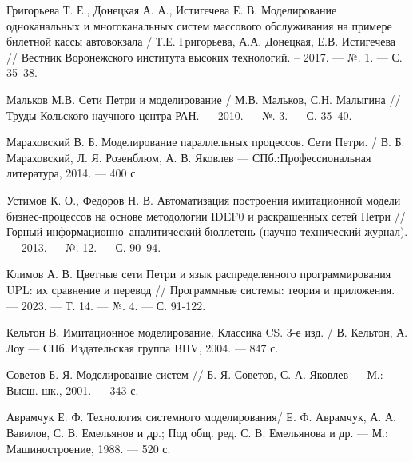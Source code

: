 \begin{thebibliography}{}
 Григорьева Т. Е., Донецкая А. А., Истигечева Е. В. Моделирование одноканальных и многоканальных систем массового обслуживания на примере билетной кассы автовокзала / Т.Е. Григорьева, А.А. Донецкая, Е.В. Истигечева  // Вестник Воронежского института высоких технологий. -- 2017. --- №. 1. --- С. 35--38.

 Мальков М.В. Сети Петри и моделирование / М.В. Мальков, С.Н. Малыгина // Труды Кольского научного центра РАН. --- 2010. --- №. 3. --- С. 35--40.

 Мараховский В. Б. Моделирование параллельных процессов. Сети Петри. / В. Б. Мараховский, Л. Я. Розенблюм,  А. В. Яковлев --- СПб.:Профессиональная литература, 2014. --- 400 с.

 Устимов К. О., Федоров Н. В. Автоматизация построения имитационной модели бизнес-процессов на основе методологии IDEF0 и раскрашенных сетей Петри // Горный информационно--аналитический бюллетень (научно-технический журнал). --- 2013. --- №. 12. --- С. 90--94.

 Климов А. В. Цветные сети Петри и язык распределенного программирования UPL: их сравнение и перевод // Программные системы: теория и приложения. --- 2023. --- Т. 14. --- №. 4. --- С. 91-122.

 Кельтон В. Имитационное моделирование. Классика CS. 3-е изд. / В. Кельтон, А. Лоу --- СПб.:Издательская группа BHV, 2004. --- 847 с.

 Советов Б. Я. Моделирование систем //  Б. Я. Советов, С. А. Яковлев --- М.: Высш. шк., 2001. --- 343 с.

 Аврамчук Е. Ф. Технология системного моделирования/ Е. Ф. Аврамчук, А. А. Вавилов, С. В. Емельянов и др.; Под общ. ред. С. В. Емельянова и др. — М.: Машиностроение, 1988. --- 520 с.

\end{thebibliography}